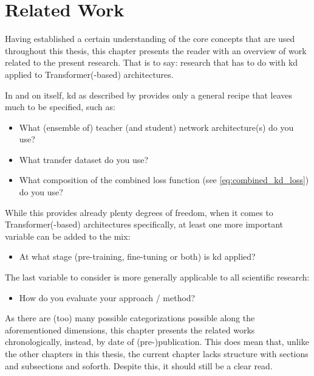 \chapter{Related Work}
\label{ch:related_work}
\glsresetall
Having established a certain understanding of the core concepts that are used throughout this thesis, this chapter presents the reader with an overview of work related to the present research. That is to say: research that has to do with \gls{kd} applied to Transformer(-based) architectures.

In and on itself, \gls{kd} as described by \citet{hinton2015distilling} provides only a general recipe that leaves much to be specified, such as:
\begin{fullwidth}
\begin{itemize}
    \item What (ensemble of) teacher (and student) network architecture(s) do you use?
    \item What transfer dataset do you use?
    \item What composition of the combined loss function (see \cref{eq:combined_kd_loss}) do you use?
\end{itemize}
\end{fullwidth}

While this provides already plenty degrees of freedom, when it comes to Transformer(-based) architectures specifically, at least one more important variable can be added to the mix:
\begin{fullwidth}
\begin{itemize}
    \item At what stage (pre-training, fine-tuning or both) is \gls{kd} applied?
\end{itemize}
\end{fullwidth}

The last variable to consider is more generally applicable to all scientific research:
\begin{fullwidth}
\begin{itemize}
    \item How do you evaluate your approach / method?
\end{itemize}
\end{fullwidth}

As there are (too) many possible categorizations possible along the aforementioned dimensions, this chapter presents the related works chronologically, instead, by date of (pre-)publication. This does mean that, unlike the other chapters in this thesis, the current chapter lacks structure with sections and subsections and soforth. Despite this, it should still be a clear read.



